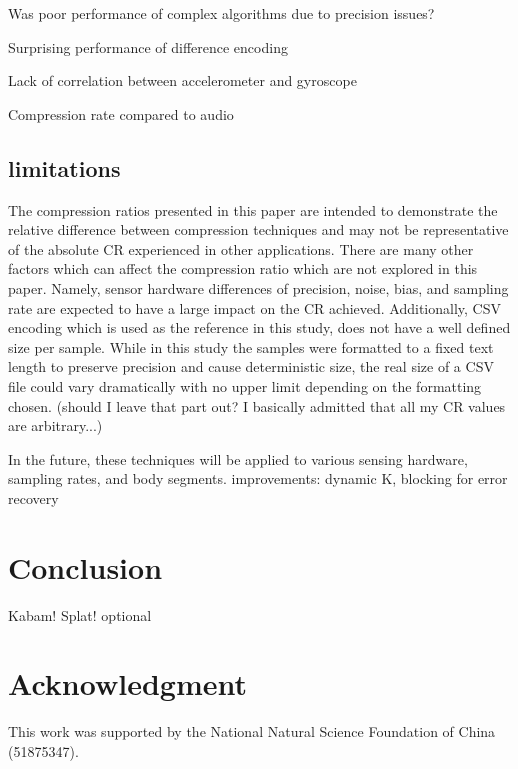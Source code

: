 \documentclass[journal]{IEEEtran}
\begin{document}
Was poor performance of complex algorithms due to precision issues?

Surprising performance of difference encoding

Lack of correlation between accelerometer and gyroscope

Compression rate compared to audio

\subsection{limitations}

The compression ratios presented in this paper are intended to demonstrate the relative difference between compression techniques and may not be representative of the absolute CR experienced in other applications. There are many other factors which can affect the compression ratio which are not explored in this paper. Namely, sensor hardware differences of precision, noise, bias, and sampling rate are expected to have a large impact on the CR achieved. Additionally, CSV encoding which is used as the reference in this study, does not have a well defined size per sample. While in this study the samples were formatted to a fixed text length to preserve precision and cause deterministic size, the real size of a CSV file could vary dramatically with no upper limit depending on the formatting chosen. (should I leave that part out? I basically admitted that all my CR values are arbitrary...)

In the future, these techniques will be applied to various sensing hardware, sampling rates, and body segments.
improvements: dynamic K, blocking for error recovery

\section{Conclusion}
Kabam! Splat!
optional



\section*{Acknowledgment}
This work was supported by the National Natural Science
Foundation of China (51875347).




{}

\end{document}
